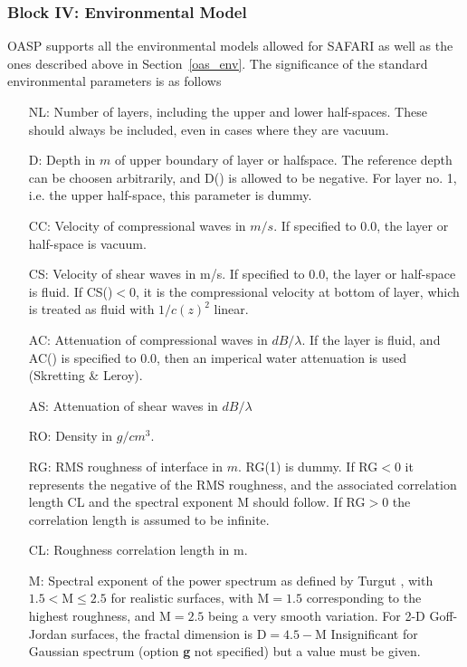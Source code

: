 \subsubsection{Block IV: Environmental Model}

OASP supports all the environmental models allowed for SAFARI as well as the
ones described above in Section~\ref{oas_env}.  The significance of
the standard environmental parameters is as follows
\begin{itemize}	
		\item[NL:]	Number of layers, including the upper and lower
		half-spaces. These should always be included,
		even in cases where they are vacuum.

		\item[D:]	Depth in $m$ of upper boundary of layer or
		halfspace. The reference depth can be choosen
		arbitrarily, and D() is allowed to be negative.
		For layer no. 1, i.e. the upper half-space, this
     		parameter is dummy.

		\item[CC:]	Velocity of compressional waves in $m/s$.
        	If specified to 0.0, the layer or half-space is
		vacuum.

		\item[CS:]	Velocity of shear waves in m/s.
 		If specified to 0.0, the layer or half-space is fluid.
                If CS()$< 0$, it is the compressional velocity at bottom of
		layer, which is treated as fluid with $1/c(z)^{2}$ linear.

		\item[AC:]   Attenuation of compressional waves in 
		$dB/\lambda$. If the layer is fluid, and AC() is specified to
		0.0, then an imperical water attenuation is
		used (Skretting \& Leroy).

		\item[AS:]   Attenuation of shear waves in $dB/\lambda$

		\item[RO:]   Density in $g/cm^{3}$.

		\item[RG:]  RMS roughness of interface in $m$. RG(1) is dummy. If RG$<0$ it represents the negative of the RMS roughness, and the associated correlation length CL and the spectral exponent M should follow. If RG$>0$ the correlation length is assumed to be infinite.
		\item[CL:] Roughness correlation length in m. 

                \item[M:] Spectral exponent of the power spectrum as
                defined by Turgut \cite{Turgut_97}, with $1.5 <
                \mbox{M} \le 2.5 $ for realistic surfaces, with
                $\mbox{M} =1.5 $ corresponding to the highest
                roughness, and $\mbox{M}=2.5$ being a very smooth
                variation. For 2-D Goff-Jordan surfaces, the fractal
                dimension is $ \mbox{D} = 4.5 - \mbox{M} $
                Insignificant
                for Gaussian spectrum (option {\bf g} not specified)
                but a  value must
                be given.
		\end{itemize}



